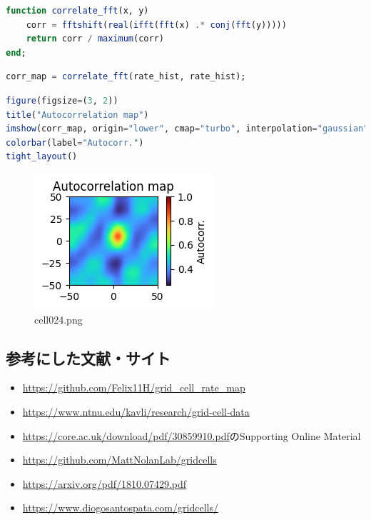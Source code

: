 \begin{lstlisting}[language=julia]
function correlate_fft(x, y)
    corr = fftshift(real(ifft(fft(x) .* conj(fft(y)))))
    return corr / maximum(corr)
end;
\end{lstlisting}
\begin{lstlisting}[language=julia]
corr_map = correlate_fft(rate_hist, rate_hist);
\end{lstlisting}
\begin{lstlisting}[language=julia]
figure(figsize=(3, 2))
title("Autocorrelation map")
imshow(corr_map, origin="lower", cmap="turbo", interpolation="gaussian", extent=[-50, 50, -50, 50])
colorbar(label="Autocorr.")
tight_layout()
\end{lstlisting}
\begin{figure}[ht]
	\centering
	\includegraphics[scale=0.8, max width=\linewidth]{./fig/appendix/grid-cells-decoding/cell024.png}
	\caption{cell024.png}
	\label{cell024.png}
\end{figure}
\subsection{参考にした文献・サイト}
\begin{itemize}
\item \url{https://github.com/Felix11H/grid_cell_rate_map}
\item \url{https://www.ntnu.edu/kavli/research/grid-cell-data}
\item \url{https://core.ac.uk/download/pdf/30859910.pdf}のSupporting Online Material
\item \url{https://github.com/MattNolanLab/gridcells}
\item \url{https://arxiv.org/pdf/1810.07429.pdf}
\item \url{https://www.diogosantospata.com/gridcells/}
\end{itemize}
